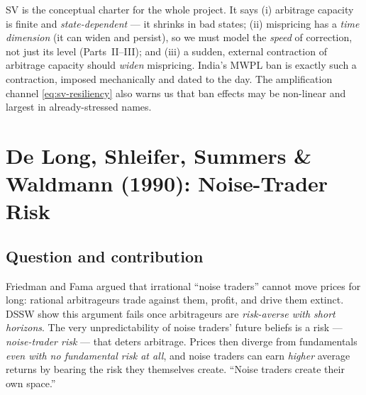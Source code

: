\begin{takeaway}
SV is the conceptual charter for the whole project. It says (i) arbitrage capacity is finite and \emph{state-dependent} --- it shrinks in bad states; (ii) mispricing has a \emph{time dimension} (it can widen and persist), so we must model the \emph{speed} of correction, not just its level (Parts~II--III); and (iii) a sudden, external contraction of arbitrage capacity should \emph{widen} mispricing. India's MWPL ban is exactly such a contraction, imposed mechanically and dated to the day. The amplification channel \eqref{eq:sv-resiliency} also warns us that ban effects may be non-linear and largest in already-stressed names.
\end{takeaway}

\section{De Long, Shleifer, Summers \& Waldmann (1990): Noise-Trader Risk}
\label{sec:dssw}

\subsection*{Question and contribution}
Friedman and Fama argued that irrational ``noise traders'' cannot move prices for long: rational arbitrageurs trade against them, profit, and drive them extinct. DSSW show this argument fails once arbitrageurs are \emph{risk-averse with short horizons}. The very unpredictability of noise traders' future beliefs is a risk --- \emph{noise-trader risk} --- that deters arbitrage. Prices then diverge from fundamentals \emph{even with no fundamental risk at all}, and noise traders can earn \emph{higher} average returns by bearing the risk they themselves create. ``Noise traders create their own space.''

